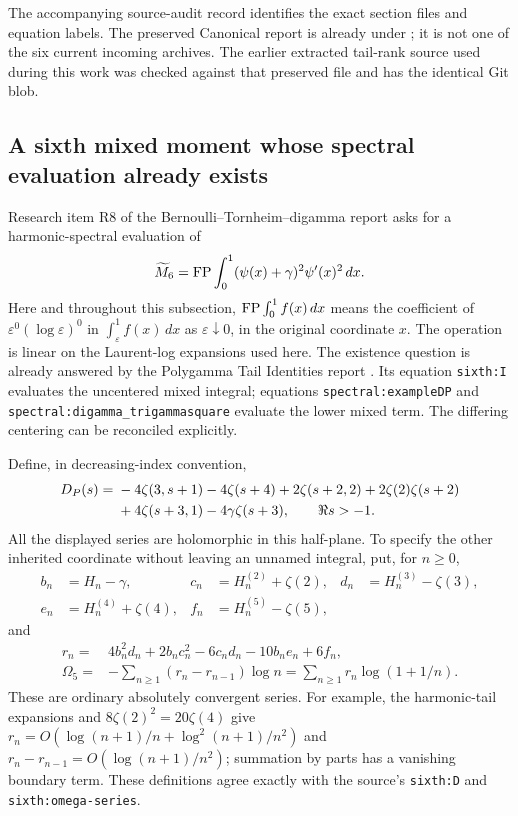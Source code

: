The accompanying source-audit record identifies the exact section files
and equation labels. The preserved Canonical report is already under
;
it is not one of the six current incoming archives. The earlier extracted
tail-rank source used during this work was checked against that preserved
file and has the identical Git blob.

\subsection{A sixth mixed moment whose spectral evaluation already exists}
\label{sh:audit-sixth}

Research item R8 of the Bernoulli--Tornheim--digamma report asks for a
harmonic-spectral evaluation of
\[
 \widetilde M_6=\operatorname{FP}\int_0^1(\psi(x)+\gamma)^2\psi'(x)^2\,dx.
\]
Here and throughout this subsection, $\operatorname{FP}\int_0^1f(x)\,dx$ means the
coefficient of $\varepsilon^0(\log\varepsilon)^0$ in
$\int_\varepsilon^1f(x)\,dx$ as $\varepsilon\downarrow0$, in the
original coordinate $x$. The operation is linear on the Laurent-log
expansions used here. The existence question is already answered by
the Polygamma Tail Identities report \cite{Polygamma}. Its equation
\texttt{sixth:I} evaluates the uncentered mixed integral; equations
\texttt{spectral:exampleDP} and
\texttt{spectral:digamma\_trigammasquare} evaluate the lower mixed term.
The differing centering can be reconciled explicitly.

Define, in decreasing-index convention,
\begin{align}\label{audit:DP}
 D_P(s)={}&-4\zeta(3,s+1)-4\zeta(s+4)
          +2\zeta(s+2,2)+2\zeta(2)\zeta(s+2)\notag\\
         &+4\zeta(s+3,1)-4\gamma\zeta(s+3),\qquad \Re s>-1.
\end{align}
All the displayed series are holomorphic in this half-plane. To specify
the other inherited coordinate without leaving an unnamed integral,
put, for $n\ge0$,
\begin{align*}
 b_n&=H_n-\gamma,&c_n&=H_n^{(2)}+\zeta(2),&
 d_n&=H_n^{(3)}-\zeta(3),\\
 e_n&=H_n^{(4)}+\zeta(4),&f_n&=H_n^{(5)}-\zeta(5),
\end{align*}
and
\begin{align}
 r_n={}&4b_n^2d_n+2b_nc_n^2-6c_nd_n-10b_ne_n+6f_n,
       \label{audit:residue}\\
 \Omega_5={}&-\sum_{n\ge1}(r_n-r_{n-1})\log n
           =\sum_{n\ge1}r_n\log(1+1/n).\label{audit:Omega}
\end{align}
These are ordinary absolutely convergent series. For example, the
harmonic-tail expansions and $8\zeta(2)^2=20\zeta(4)$ give
$r_n=O(\log(n+1)/n+\log^2(n+1)/n^2)$ and
$r_n-r_{n-1}=O(\log(n+1)/n^2)$; summation by parts has a vanishing
boundary term. These definitions agree exactly with the source's
\texttt{sixth:D} and \texttt{sixth:omega-series}.

